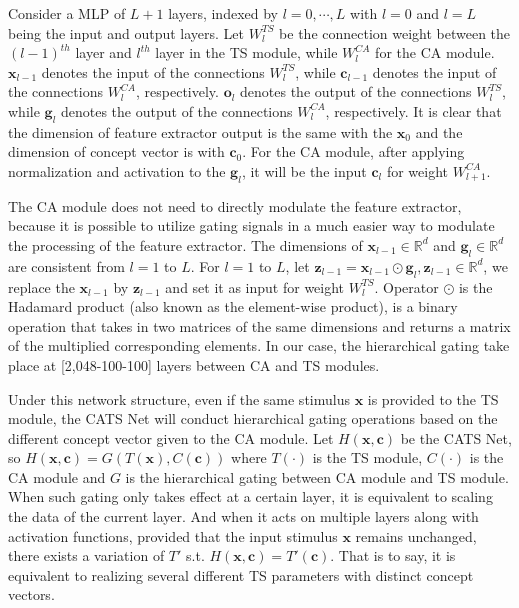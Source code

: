 \documentclass[pdflatex,sn-mathphys-num,lineno]{sn-jnl}%
\begin{document}
\begin{CJK}{UTF8}{gbsn}
Consider a MLP of $L+1$ layers, indexed by $l=0,\cdots,L$ with $l = 0$ and $l = L$ being the input and output layers. Let $W_l^{TS}$ be the connection weight between the $(l-1)^{th}$ layer and $l^{th}$ layer in the TS module, while $W_l^{CA}$ for the CA module. $\mathbf{x}_{l-1}$ denotes the input of the connections $W_l^{TS}$, while $\mathbf{c}_{l-1}$ denotes the input of the connections $W_l^{CA}$, respectively. $\mathbf{o}_{l}$ denotes the output of the connections $W_l^{TS}$, while $\mathbf{g}_{l}$ denotes the output of the connections $W_l^{CA}$, respectively. It is clear that the dimension of feature extractor output is the same with the $\mathbf{x}_{0}$ and the dimension of concept vector is with $\mathbf{c}_{0}$. For the CA module, after applying normalization and activation to the $\mathbf{g}_{l}$, it will be the input $\mathbf{c}_{l}$ for weight $W_{l+1}^{CA}$.

The CA module does not need to directly modulate the feature extractor, because it is possible to utilize gating signals in a much easier way to modulate the processing of the feature extractor. The dimensions of $\mathbf{x}_{l-1} \in \mathbb{R}^{d}$ and $\mathbf{g}_{l} \in \mathbb{R}^{d}$ are consistent from $l=1$ to $L$. For $l=1$ to $L$, let $\mathbf{z}_{l-1} = \mathbf{x}_{l-1} \odot \mathbf{g}_{l}, \mathbf{z}_{l-1} \in \mathbb{R}^{d}$, we replace the $\mathbf{x}_{l-1}$ by $\mathbf{z}_{l-1}$ and set it as input for weight $W_{l}^{TS}$. Operator $\odot$ is the Hadamard product (also known as the element-wise product), is a binary operation that takes in two matrices of the same dimensions and returns a matrix of the multiplied corresponding elements. In our case, the hierarchical gating take place at [2,048-100-100] layers between CA and TS modules.

Under this network structure, even if the same stimulus $\mathbf{x}$ is provided to the TS module, the CATS Net will conduct hierarchical gating operations based on the different concept vector given to the CA module. Let $H(\mathbf{x}, \mathbf{c})$ be the CATS Net, so $H(\mathbf{x}, \mathbf{c}) = G(T(\mathbf{x}), C(\mathbf{c}))$ where $T(\cdot)$ is the TS module, $C(\cdot)$ is the CA module and $G$ is the hierarchical gating between CA module and TS module. When such gating only takes effect at a certain layer, it is equivalent to scaling the data of the current layer. And when it acts on multiple layers along with activation functions, provided that the input stimulus $\mathbf{x}$ remains unchanged, there exists a variation of $T'$ s.t. $H(\mathbf{x}, \mathbf{c}) = T'(\mathbf{c})$. That is to say, it is equivalent to realizing several different TS parameters with distinct concept vectors.


\end{CJK}
\end{document}
